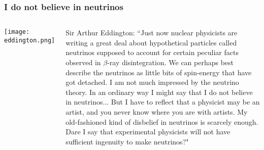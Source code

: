 \begin{frame}
\frametitle{I do not believe in neutrinos}
\begin{columns}
\texttt{[image: eddington.png]}
 
Sir Arthur Eddington: ``Just now nuclear physicists are writing a great deal about hypothetical particles called neutrinos supposed to account for certain peculiar facts observed in $\beta$-ray disintegration. We can perhaps best describe the neutrinos as little bits of spin-energy that have got detached. I am not much impressed by the neutrino theory. In an ordinary way I might say that I do not believe in neutrinos... But I have to reflect that a physicist may be an artist, and you never know where you are with artists. My old-fashioned kind of disbelief in neutrinos is scarcely enough. Dare I say that experimental physicists will not have sufficient ingenuity to make neutrinos?"

\end{columns}
\end{frame}
